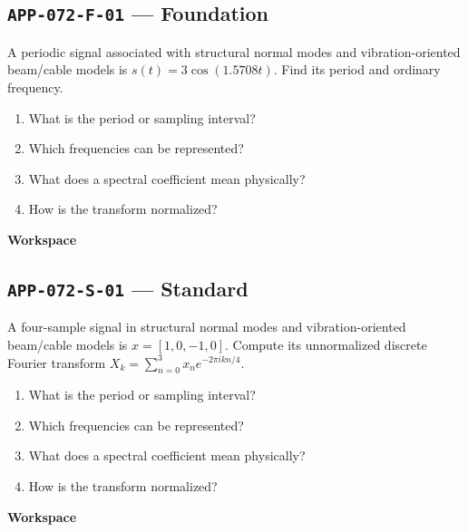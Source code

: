 \documentclass[11pt]{book}
\newcommand{\pid}[1]{\texttt{#1}}
\newcommand{\workspace}{\par\vspace{0.7in}\hrulefill\par\vspace{0.55in}\hrulefill\par}
\begin{document}
\subsection*{\pid{APP-072-F-01} — Foundation}
\begin{problembox}
A periodic signal associated with structural normal modes and vibration-oriented beam/cable models is $s(t)=3\cos(1.5708t)$. Find its period and ordinary frequency.
\end{problembox}
\begin{promptbox}\begin{enumerate}
\item What is the period or sampling interval?
\item Which frequencies can be represented?
\item What does a spectral coefficient mean physically?
\item How is the transform normalized?
\end{enumerate}\end{promptbox}
\textbf{Workspace}\workspace
{}
\subsection*{\pid{APP-072-S-01} — Standard}
\begin{problembox}
A four-sample signal in structural normal modes and vibration-oriented beam/cable models is $x=[1,0,-1,0]$. Compute its unnormalized discrete Fourier transform $X_k=\sum_{n=0}^3 x_ne^{-2\pi i kn/4}$.
\end{problembox}
\begin{promptbox}\begin{enumerate}
\item What is the period or sampling interval?
\item Which frequencies can be represented?
\item What does a spectral coefficient mean physically?
\item How is the transform normalized?
\end{enumerate}\end{promptbox}
\textbf{Workspace}\workspace
{}
\end{document}

